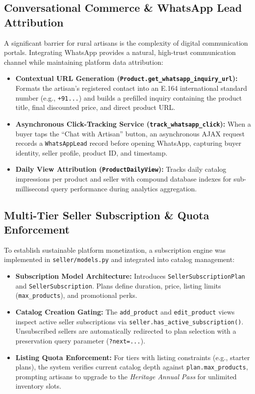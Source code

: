 \documentclass[12pt,a4paper]{article}
\begin{document}
\subsection{Conversational Commerce \& WhatsApp Lead Attribution}
A significant barrier for rural artisans is the complexity of digital communication portals. Integrating WhatsApp provides a natural, high-trust communication channel while maintaining platform data attribution:
\begin{itemize}
    \item \textbf{Contextual URL Generation (\texttt{Product.get\_whatsapp\_inquiry\_url}):} Formats the artisan's registered contact into an E.164 international standard number (e.g., \texttt{+91...}) and builds a prefilled inquiry containing the product title, final discounted price, and direct product URL.
    \item \textbf{Asynchronous Click-Tracking Service (\texttt{track\_whatsapp\_click}):} When a buyer taps the ``Chat with Artisan'' button, an asynchronous AJAX request records a \texttt{WhatsAppLead} record before opening WhatsApp, capturing buyer identity, seller profile, product ID, and timestamp.
    \item \textbf{Daily View Attribution (\texttt{ProductDailyView}):} Tracks daily catalog impressions per product and seller with compound database indexes for sub-millisecond query performance during analytics aggregation.
\end{itemize}

\subsection{Multi-Tier Seller Subscription \& Quota Enforcement}
To establish sustainable platform monetization, a subscription engine was implemented in \texttt{seller/models.py} and integrated into catalog management:
\begin{itemize}
    \item \textbf{Subscription Model Architecture:} Introduces \texttt{SellerSubscriptionPlan} and \texttt{SellerSubscription}. Plans define duration, price, listing limits (\texttt{max\_products}), and promotional perks.
    \item \textbf{Catalog Creation Gating:} The \texttt{add\_product} and \texttt{edit\_product} views inspect active seller subscriptions via \texttt{seller.has\_active\_subscription()}. Unsubscribed sellers are automatically redirected to plan selection with a preservation query parameter (\texttt{?next=...}).
    \item \textbf{Listing Quota Enforcement:} For tiers with listing constraints (e.g., starter plans), the system verifies current catalog depth against \texttt{plan.max\_products}, prompting artisans to upgrade to the \emph{Heritage Annual Pass} for unlimited inventory slots.
\end{itemize}
\end{document}
